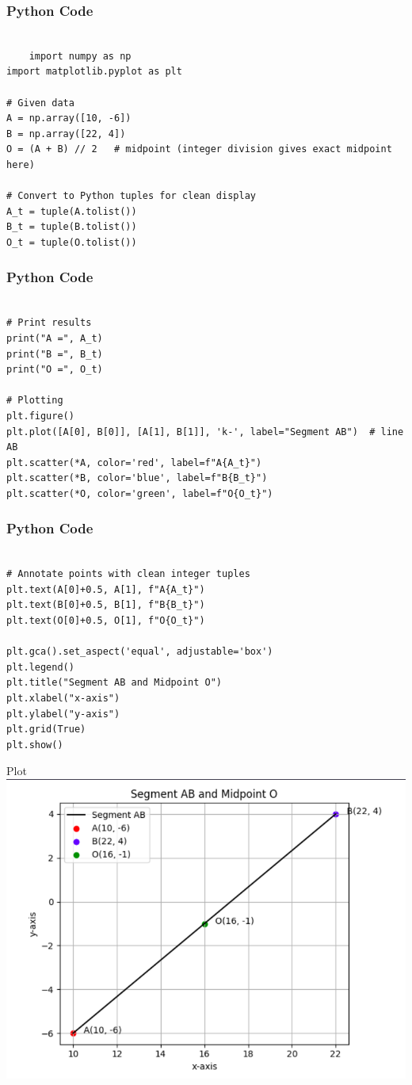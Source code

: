 \documentclass{beamer}
\begin{document}
\begin{frame}[fragile]
    \frametitle{Python Code}
    \begin{lstlisting}

    import numpy as np
import matplotlib.pyplot as plt

# Given data
A = np.array([10, -6])
B = np.array([22, 4])
O = (A + B) // 2   # midpoint (integer division gives exact midpoint here)

# Convert to Python tuples for clean display
A_t = tuple(A.tolist())
B_t = tuple(B.tolist())
O_t = tuple(O.tolist())
\end{lstlisting}
\end{frame}
\begin{frame}[fragile]
    \frametitle{Python Code}
    \begin{lstlisting}

# Print results
print("A =", A_t)
print("B =", B_t)
print("O =", O_t)

# Plotting
plt.figure()
plt.plot([A[0], B[0]], [A[1], B[1]], 'k-', label="Segment AB")  # line AB
plt.scatter(*A, color='red', label=f"A{A_t}")
plt.scatter(*B, color='blue', label=f"B{B_t}")
plt.scatter(*O, color='green', label=f"O{O_t}")
\end{lstlisting}
\end{frame}
\begin{frame}[fragile]
    \frametitle{Python Code}
    \begin{lstlisting}

# Annotate points with clean integer tuples
plt.text(A[0]+0.5, A[1], f"A{A_t}")
plt.text(B[0]+0.5, B[1], f"B{B_t}")
plt.text(O[0]+0.5, O[1], f"O{O_t}")

plt.gca().set_aspect('equal', adjustable='box')
plt.legend()
plt.title("Segment AB and Midpoint O")
plt.xlabel("x-axis")
plt.ylabel("y-axis")
plt.grid(True)
plt.show()

\end{lstlisting}
\end{frame}

\begin{frame}{Plot}
    \centering
    \includegraphics[width=\columnwidth, height=0.8\textheight, keepaspectratio]{figs/mg2.png}     
\end{frame}
\end{document}
